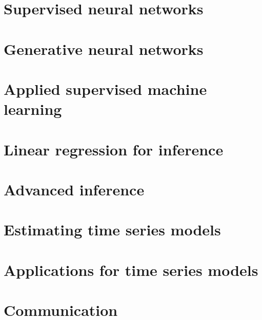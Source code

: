\documentclass[oneside]{book}
\begin{document}
\part{Supervised neural networks}










\part{Generative neural networks}





\part{Applied supervised machine learning}





\part{Linear regression for inference}






\part{Advanced inference}









\part{Estimating time series models}










\part{Applications for time series models}







\part{Communication}






\end{document}
